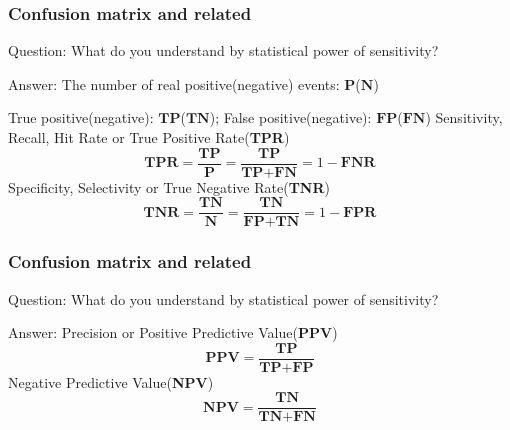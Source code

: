 \documentclass[11pt]{beamer}
\begin{document}
\begin{frame}
\frametitle{Confusion matrix and related}
\begin{block}{Question:}
	What do you understand by statistical power of sensitivity?
\end{block}
\begin{block}{Answer:}
	The number of real positive(negative) events: $\textbf{P}$($\textbf{N}$)
	
	True positive(negative): $\textbf{TP}$($\textbf{TN}$); False positive(negative): $\textbf{FP}$($\textbf{FN}$)
	Sensitivity, Recall, Hit Rate or True Positive Rate(\textbf{TPR})
	\[
		\textbf{TPR} = \frac{\textbf{TP}}{\textbf{P}} = \frac{\textbf{TP}}{\textbf{TP}+\textbf{FN}}
		=1 - \textbf{FNR}
	\]
	Specificity, Selectivity or True Negative Rate(\textbf{TNR})
	\[
		\textbf{TNR} = \frac{\textbf{TN}}{\textbf{N}} = \frac{\textbf{TN}}{\textbf{FP}+\textbf{TN}}
		=1 - \textbf{FPR}
	\]
\end{block}
\end{frame}

\begin{frame}
\frametitle{Confusion matrix and related}
\begin{block}{Question:}
	What do you understand by statistical power of sensitivity?
\end{block}
\begin{block}{Answer:}
	Precision or Positive Predictive Value(\textbf{PPV})
	\[
		\textbf{PPV} = \frac{\textbf{TP}}{\textbf{TP}+\textbf{FP}}
	\]
	Negative Predictive Value(\textbf{NPV})
	\[
		\textbf{NPV} = \frac{\textbf{TN}}{\textbf{TN}+\textbf{FN}}
	\]
\end{block}
\end{frame}
\end{document}
